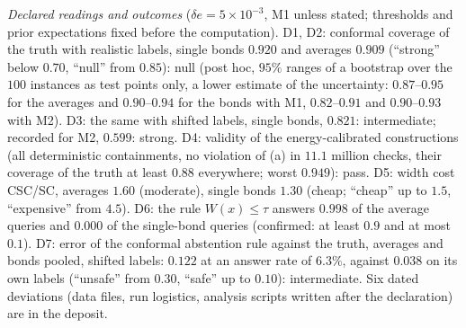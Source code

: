 \documentclass[aps,prx,onecolumn,10pt,nofootinbib,longbibliography,floatfix]{revtex4-2}
\theoremstyle{remark}
\newcommand{\de}{\delta e}
\begin{document}
\emph{Declared readings and outcomes} ($\de=5\times10^{-3}$, M1 unless stated; thresholds and prior expectations %
fixed before the computation). D1, D2: conformal coverage of the truth with realistic labels, single bonds $0.920$ %
and averages $0.909$ (``strong'' below $0.70$, ``null'' from $0.85$): null %
(post hoc, $95\%$ ranges of a bootstrap over the $100$ instances as test points only, a lower estimate of the uncertainty: $0.87$--$0.95$ for the averages and $0.90$--$0.94$ for the bonds with M1, %
$0.82$--$0.91$ and $0.90$--$0.93$ with M2). D3: the same with shifted labels, %
single bonds, $0.821$: intermediate; recorded for M2, $0.599$: strong. D4: validity of the energy-calibrated constructions %
(all deterministic containments, no violation of (a) in $11.1$ million checks, their coverage of the truth at %
least $0.88$ everywhere; worst $0.949$): pass. D5: width cost CSC/SC, averages $1.60$ (moderate), single bonds %
$1.30$ (cheap; ``cheap'' up to $1.5$, ``expensive'' from $4.5$). D6: the rule $W(x)\le\tau$ answers $0.998$ of the %
average queries and $0.000$ of the single-bond queries (confirmed: at least $0.9$ and at most $0.1$). D7: error of %
the conformal abstention rule against the truth, averages and bonds pooled, shifted labels: $0.122$ at an answer %
rate of $6.3\%$, against $0.038$ on its own labels (``unsafe'' from $0.30$, ``safe'' up to $0.10$): intermediate. %
Six dated deviations (data files, run logistics, analysis scripts written after the declaration) are in the deposit. %
\end{document}
